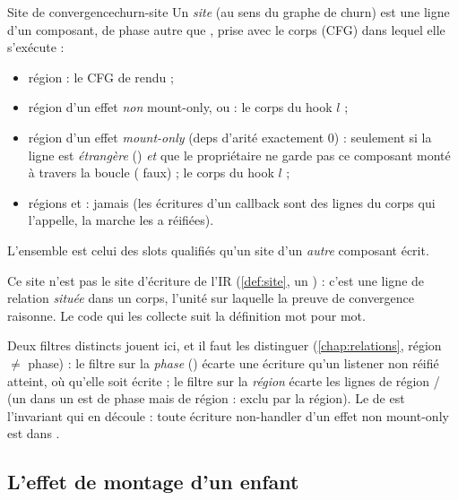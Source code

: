 \begin{definition}{Site de convergence}{churn-site}
Un \emph{site} (au sens du graphe de churn) est une ligne  d'un
composant, de phase autre que , prise avec le corps (CFG) dans lequel elle
s'exécute :
\begin{itemize}
  \item région  : le CFG de rendu ;
  \item région  d'un effet \emph{non} mount-only, ou  : le
        corps du hook $l$ ;
  \item région  d'un effet \emph{mount-only} (deps d'arité exactement 0) :
        seulement si la ligne est \emph{étrangère} () \emph{et} que le
        propriétaire ne garde pas ce composant monté à travers la boucle
        ( faux) ; le corps du hook $l$ ;
  \item régions  et  : jamais (les écritures d'un
        callback sont des lignes du corps qui l'appelle, la marche les a réifiées).
\end{itemize}
L'ensemble  est celui des slots qualifiés qu'un site d'un \emph{autre}
composant écrit.
\end{definition}

Ce \og site\fg{} n'est pas le site d'écriture de l'IR (\cref{def:site}, un ) :
c'est une ligne de relation \emph{située} dans un corps, l'unité sur laquelle la preuve de
convergence raisonne. Le code qui les collecte suit la définition mot pour mot.


Deux filtres distincts jouent ici, et il faut les distinguer (\cref{chap:relations},
région $\neq$ phase) : le filtre sur la \emph{phase} () écarte une écriture
qu'un listener non réifié atteint, où qu'elle soit écrite ; le filtre sur la \emph{région}
écarte les lignes de région / (un  dans un
 est de phase  mais de région  : exclu par la
région). Le  de
 est l'invariant qui en découle : toute écriture non-handler
d'un effet non mount-only est dans .

\subsection{L'effet de montage d'un enfant}

